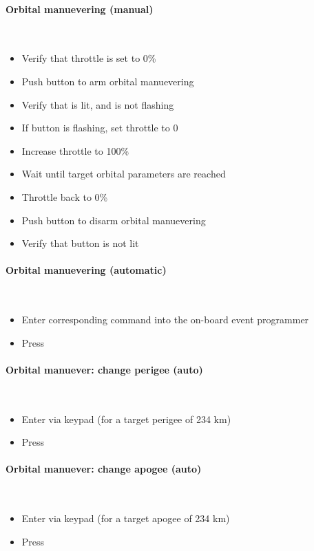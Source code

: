 \paragraph{Orbital manuevering (manual)}~
\begin{itemize}
	\item Verify that throttle is set to 0\%
	\item Push  button to arm orbital manuevering
	\item Verify that  is lit, and is not flashing
	\item If  button is flashing, set throttle to 0
	\item Increase throttle to 100\%
	\item Wait until target orbital parameters are reached
	\item Throttle back to 0\%
	\item Push  button to disarm orbital manuevering
	\item Verify that  button is not lit
\end{itemize}

\paragraph{Orbital manuevering (automatic)}~
\begin{itemize}
  \item Enter corresponding command into the on-board event programmer
  \item Press 
\end{itemize}

\paragraph{Orbital manuever: change perigee (auto)}~
\begin{itemize}
  \item Enter via keypad  (for a target perigee of 234 km)
  \item Press   
\end{itemize}

\paragraph{Orbital manuever: change apogee (auto)}~
\begin{itemize}
  \item Enter via keypad  (for a target apogee of 234 km)
  \item Press   
\end{itemize}


